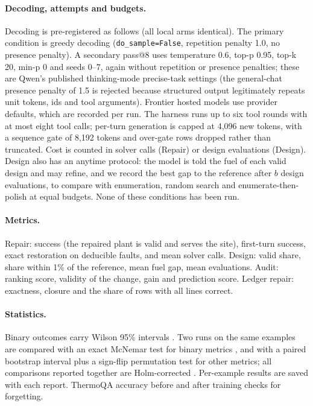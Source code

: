 \paragraph{Decoding, attempts and budgets.}
Decoding is pre-registered as follows (all local arms identical). The primary condition is greedy decoding (\texttt{do\_sample=False}, repetition penalty 1.0, no presence penalty). A secondary pass@8 uses temperature 0.6, top-p 0.95, top-k 20, min-p 0 and seeds 0--7, again without repetition or presence penalties; these are Qwen's published thinking-mode precise-task settings (the general-chat presence penalty of 1.5 is rejected because structured output legitimately repeats unit tokens, ids and tool arguments). Frontier hosted models use provider defaults, which are recorded per run. The harness runs up to six tool rounds with at most eight tool calls; per-turn generation is capped at 4,096 new tokens, with a sequence gate of 8,192 tokens and over-gate rows dropped rather than truncated. Cost is counted in solver calls (Repair) or design evaluations (Design). Design also has an anytime protocol: the model is told the fuel of each valid design and may
refine, and we record the best gap to the reference after $b$ design evaluations, to compare with enumeration, random search and
enumerate-then-polish at equal budgets. None of these conditions has been run.

\paragraph{Metrics.}
Repair: success (the repaired plant is valid and serves the site), first-turn success, exact restoration on deducible faults, and mean solver calls. Design: valid share, share within 1\% of the reference, mean fuel gap, mean
evaluations. Audit: ranking score, validity of the change, gain and prediction score. Ledger repair: exactness, closure and the share of rows with all lines correct.

\paragraph{Statistics.}
Binary outcomes carry Wilson 95\% intervals \citep{wilson1927interval}. Two runs on the same examples are compared with an exact McNemar test for binary
metrics \citep{mcnemar1947}, and with a paired bootstrap interval plus a sign-flip permutation test for other metrics; all comparisons reported together are
Holm-corrected \citep{holm1979}. Per-example results are saved with each report. ThermoQA accuracy before and after training checks for forgetting.

